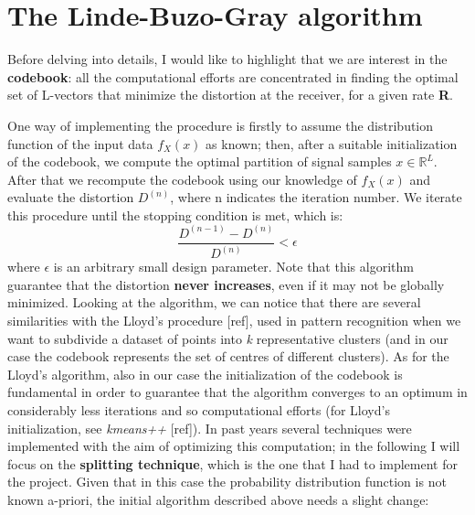 \documentclass{report}
\begin{document}
\section{The Linde-Buzo-Gray algorithm}

Before delving into details, I would like to highlight that we are interest in the \textbf{codebook}: all the computational efforts are concentrated in finding the optimal set of L-vectors that minimize the distortion at the receiver, for a given rate \textbf{R}.

One way of implementing the procedure is firstly to assume the distribution function of the input data $f_X(x)$ as known; then, after a suitable initialization of the codebook, we compute the optimal partition of signal samples $ x \in \mathbb{R}^L$. After that we recompute the codebook using our knowledge of $f_X(x)$ and evaluate the distortion $D^{(n)}$, where n indicates the iteration number. We iterate this procedure until the stopping condition is met, which is: 
\begin{equation}
\frac{D^{(n-1)} - D^{(n)}}{D^{(n)}} < \epsilon
\end{equation}
where $\epsilon$ is an arbitrary small design parameter. Note that this algorithm guarantee that the distortion \textbf{never increases}, even if it may not be globally minimized.
Looking at the algorithm, we can notice that there are several similarities with the Lloyd's procedure [ref], used in pattern recognition when we want to subdivide a dataset of points into \textit{k} representative clusters (and in our case the codebook represents the set of centres of different clusters). As for the Lloyd's algorithm, also in our case the initialization of the codebook is fundamental in order to guarantee that the algorithm converges to an optimum in considerably less iterations and so computational efforts (for Lloyd's initialization, see \textit{kmeans++} [ref]). In past years several techniques were implemented with the aim of optimizing this computation; in the following I will focus on the \textbf{splitting technique}, which is the one that I had to implement for the project. Given that in this case the probability distribution function is not known a-priori, the initial algorithm described above needs a slight change: 
\end{document}
